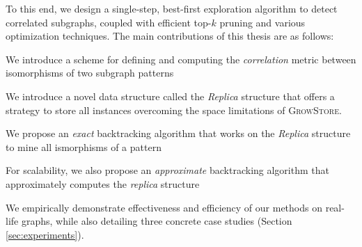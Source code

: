 
To this end, we design a single-step, best-first exploration algorithm to detect correlated subgraphs,
coupled with efficient top-$k$ pruning and various optimization techniques.
The main contributions of this thesis are as follows:
\squishlist
\item We introduce a scheme for defining and computing the \emph{correlation} metric between
isomorphisms of two subgraph patterns
\item We introduce a novel data structure called the \textit{Replica} structure
that offers a strategy to store all instances overcoming the space limitations of
\textsc{GrowStore}.
\item We propose an \textit{exact} backtracking algorithm that works on the \textit{Replica}
structure to mine all ismorphisms of a pattern
\item For scalability, we also propose an \textit{approximate} backtracking
algorithm that approximately computes the \textit{replica} structure 
\item We empirically demonstrate effectiveness and efficiency of our methods on real-life graphs,
while also detailing three concrete case studies (Section \ref{sec:experiments}).
\squishend

